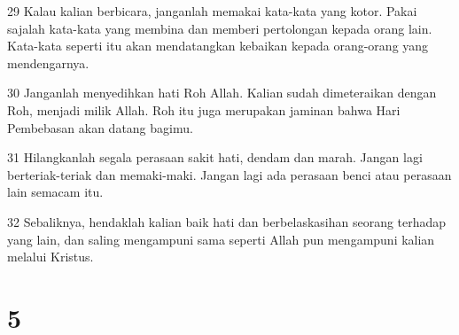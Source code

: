 \par 29 Kalau kalian berbicara, janganlah memakai kata-kata yang kotor. Pakai sajalah kata-kata yang membina dan memberi pertolongan kepada orang lain. Kata-kata seperti itu akan mendatangkan kebaikan kepada orang-orang yang mendengarnya.
\par 30 Janganlah menyedihkan hati Roh Allah. Kalian sudah dimeteraikan dengan Roh, menjadi milik Allah. Roh itu juga merupakan jaminan bahwa Hari Pembebasan akan datang bagimu.
\par 31 Hilangkanlah segala perasaan sakit hati, dendam dan marah. Jangan lagi berteriak-teriak dan memaki-maki. Jangan lagi ada perasaan benci atau perasaan lain semacam itu.
\par 32 Sebaliknya, hendaklah kalian baik hati dan berbelaskasihan seorang terhadap yang lain, dan saling mengampuni sama seperti Allah pun mengampuni kalian melalui Kristus.

\chapter{5}

